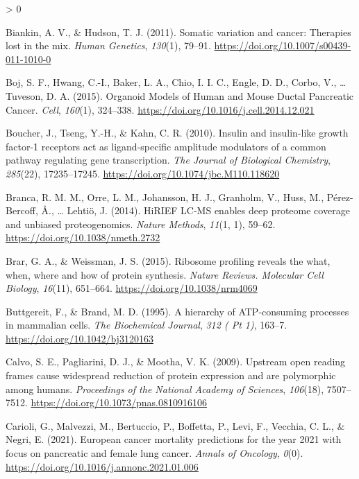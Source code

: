 \documentclass[
  12pt,
  openany]{book}
\newlength{\cslhangindent}
\newenvironment{CSLReferences}[2] %
 {%
  \setlength{\parindent}{0pt}
  \ifodd #1 \everypar{\setlength{\hangindent}{\cslhangindent}}\ignorespaces\fi
  \ifnum #2 > 0
  \setlength{\parskip}{#2\baselineskip}
  \fi
 }%
 {}
\begin{document}
\begin{CSLReferences}{1}{0}
\leavevmode\hypertarget{ref-Biankin2011}{}%
Biankin, A. V., \& Hudson, T. J. (2011). Somatic variation and cancer: Therapies lost in the mix. \emph{Human Genetics}, \emph{130}(1), 79--91. \url{https://doi.org/10.1007/s00439-011-1010-0}

\leavevmode\hypertarget{ref-Boj2015}{}%
Boj, S. F., Hwang, C.-I., Baker, L. A., Chio, I. I. C., Engle, D. D., Corbo, V., \ldots{} Tuveson, D. A. (2015). Organoid {Models} of {Human} and {Mouse Ductal Pancreatic Cancer}. \emph{Cell}, \emph{160}(1), 324--338. \url{https://doi.org/10.1016/j.cell.2014.12.021}

\leavevmode\hypertarget{ref-Boucher2010}{}%
Boucher, J., Tseng, Y.-H., \& Kahn, C. R. (2010). Insulin and insulin-like growth factor-1 receptors act as ligand-specific amplitude modulators of a common pathway regulating gene transcription. \emph{The Journal of Biological Chemistry}, \emph{285}(22), 17235--17245. \url{https://doi.org/10.1074/jbc.M110.118620}

\leavevmode\hypertarget{ref-Branca2014}{}%
Branca, R. M. M., Orre, L. M., Johansson, H. J., Granholm, V., Huss, M., Pérez-Bercoff, Å., \ldots{} Lehtiö, J. (2014). {HiRIEF LC}-{MS} enables deep proteome coverage and unbiased proteogenomics. \emph{Nature Methods}, \emph{11}(1, 1), 59--62. \url{https://doi.org/10.1038/nmeth.2732}

\leavevmode\hypertarget{ref-Brar2015}{}%
Brar, G. A., \& Weissman, J. S. (2015). Ribosome profiling reveals the what, when, where and how of protein synthesis. \emph{Nature Reviews. Molecular Cell Biology}, \emph{16}(11), 651--664. \url{https://doi.org/10.1038/nrm4069}

\leavevmode\hypertarget{ref-Buttgereit1995}{}%
Buttgereit, F., \& Brand, M. D. (1995). A hierarchy of {ATP}-consuming processes in mammalian cells. \emph{The Biochemical Journal}, \emph{312 ( Pt 1)}, 163--7. \url{https://doi.org/10.1042/bj3120163}

\leavevmode\hypertarget{ref-Calvo2009}{}%
Calvo, S. E., Pagliarini, D. J., \& Mootha, V. K. (2009). Upstream open reading frames cause widespread reduction of protein expression and are polymorphic among humans. \emph{Proceedings of the National Academy of Sciences}, \emph{106}(18), 7507--7512. \url{https://doi.org/10.1073/pnas.0810916106}

\leavevmode\hypertarget{ref-Carioli2021}{}%
Carioli, G., Malvezzi, M., Bertuccio, P., Boffetta, P., Levi, F., Vecchia, C. L., \& Negri, E. (2021). European cancer mortality predictions for the year 2021 with focus on pancreatic and female lung cancer. \emph{Annals of Oncology}, \emph{0}(0). \url{https://doi.org/10.1016/j.annonc.2021.01.006}


\end{CSLReferences}
\end{document}
